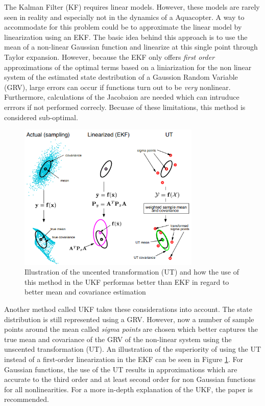 \documentclass[../Head/report.tex]{subfiles}
\begin{document}
The Kalman Filter (KF) requires linear models. However, these models are rarely seen in reality and especially not in the dynamics of a Aquacopter. A way to accommodate for this problem could be to approximate the linear model by linearization using an EKF. The basic idea behind this approach is to use the mean of a non-linear Gaussian function and linearize at this single point through Taylor expansion. However, because the EKF only offers \textit{first order} approximations of the optimal terms based on a liniarization for the non linear system of the estimated state destribution of a Gaussion Random Variable (GRV), large errors can occur if functions turn out to be \textit{very} nonlinear. Furthermore, calculations of the Jacobaion are needed which can intruduce errrors if not performed correcly. Becuase of these limitations, this method is considered sub-optimal.  

\begin{figure}[H]
	\centering
	\includegraphics[height=7.0cm]{../Figures/ukf.png}
	\caption{Illustration of the uncented transformation (UT) and how the use of this method in the UKF performas better than EKF in regard to better mean and covariance estimation \cite{UnscentedKalmanFilter}} \label{fig:ut}
\end{figure}

Another method called UKF takes these considerations into account. The state distribution is still represented using a GRV. However, now a number of sample points around the mean called \textit{sigma points} are chosen which better captures the true mean and covariance of the GRV of the non-linear system using the unscented transformation (UT). An illustration of the superiority of using the UT instead of a first-order linearization in the EKF can be seen in Figure \ref{fig:ut}. For Gaussian functions, the use of the UT results in approximations which are accurate to the third order and at least second order for non Gaussian functions for all nonlinearities. For a more in-depth explanation of the UKF, the paper \cite{UnscentedKalmanFilter} is recommended.  
\end{document}
